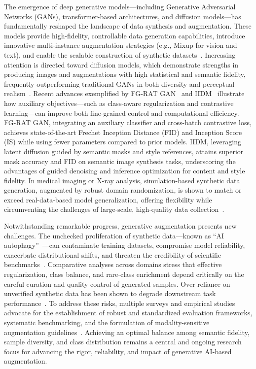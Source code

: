 \documentclass[sigconf]{acmart}
\begin{document}
The emergence of deep generative models—including Generative Adversarial Networks (GANs), transformer-based architectures, and diffusion models—has fundamentally reshaped the landscape of data synthesis and augmentation. These models provide high-fidelity, controllable data generation capabilities, introduce innovative multi-instance augmentation strategies (e.g., Mixup for vision and text), and enable the scalable construction of synthetic datasets~\cite{ref61,ref62,ref64,ref81,ref82,ref87,ref101}. Increasing attention is directed toward diffusion models, which demonstrate strengths in producing images and augmentations with high statistical and semantic fidelity, frequently outperforming traditional GANs in both diversity and perceptual realism~\cite{ref82,ref87,ref101,ref102}. Recent advances exemplified by FG-RAT GAN~\cite{ref101} and IIDM~\cite{ref102} illustrate how auxiliary objectives—such as class-aware regularization and contrastive learning—can improve both fine-grained control and computational efficiency. FG-RAT GAN, integrating an auxiliary classifier and cross-batch contrastive loss, achieves state-of-the-art Frechet Inception Distance (FID) and Inception Score (IS) while using fewer parameters compared to prior models. IIDM, leveraging latent diffusion guided by semantic masks and style references, attains superior mask accuracy and FID on semantic image synthesis tasks, underscoring the advantages of guided denoising and inference optimization for content and style fidelity. In medical imaging or X-ray analysis, simulation-based synthetic data generation, augmented by robust domain randomization, is shown to match or exceed real-data-based model generalization, offering flexibility while circumventing the challenges of large-scale, high-quality data collection~\cite{ref81}.

Notwithstanding remarkable progress, generative augmentation presents new challenges. The unchecked proliferation of synthetic data—known as ``AI autophagy''~\cite{ref82}—can contaminate training datasets, compromise model reliability, exacerbate distributional shifts, and threaten the credibility of scientific benchmarks~\cite{ref82,ref90,ref101}. Comparative analyses across domains stress that effective regularization, class balance, and rare-class enrichment depend critically on the careful curation and quality control of generated samples. Over-reliance on unverified synthetic data has been shown to degrade downstream task performance~\cite{ref90,ref101}. To address these risks, multiple surveys and empirical studies advocate for the establishment of robust and standardized evaluation frameworks, systematic benchmarking, and the formulation of modality-sensitive augmentation guidelines~\cite{ref61,ref62,ref64,ref82,ref87,ref90,ref101,ref102}. Achieving an optimal balance among semantic fidelity, sample diversity, and class distribution remains a central and ongoing research focus for advancing the rigor, reliability, and impact of generative AI-based augmentation.
\end{document}
